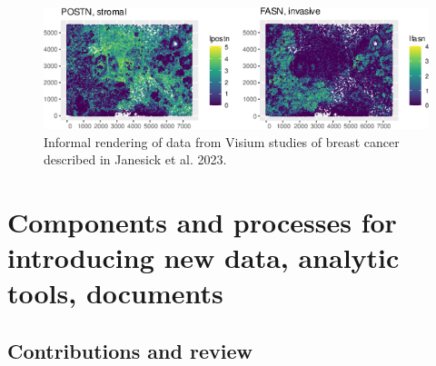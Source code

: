 \begin{Shaded}
\begin{Highlighting}[]
\StringTok{ }\NormalTok{(}\OperatorTok{$}\NormalTok{(}\OperatorTok{+}
\StringTok{  }\NormalTok{(}\NormalTok{) }\OperatorTok{+}\StringTok{ }\NormalTok{() }\OperatorTok{+}\StringTok{ }\NormalTok{(}\NormalTok{)}
\StringTok{ }\NormalTok{(}\OperatorTok{$}\NormalTok{(}\OperatorTok{+}
\StringTok{  }\NormalTok{(}\NormalTok{) }\OperatorTok{+}\StringTok{ }\NormalTok{() }\OperatorTok{+}\StringTok{ }\NormalTok{(}\NormalTok{)}
\NormalTok{)}
\end{Highlighting}
\end{Shaded}

\begin{figure}
\includegraphics[width=1\linewidth,]{bioccb_files/figure-latex/dospat-1} \caption{Informal rendering of data from Visium studies of breast cancer described in Janesick et al. 2023.}\label{fig:dospat}
\end{figure}

\hypertarget{class}{%
\section{Components and processes for introducing new data, analytic tools, documents}\label{class}}

\hypertarget{contributions-and-review}{%
\subsection{Contributions and review}\label{contributions-and-review}}


